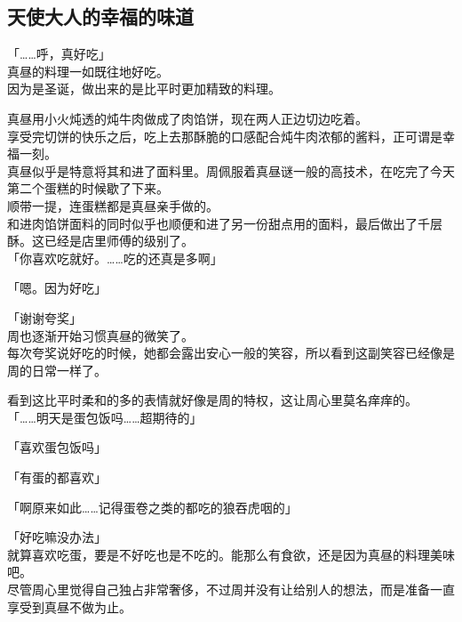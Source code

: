 \subsection{天使大人的幸福的味道}

「……呼，真好吃」\\

真昼的料理一如既往地好吃。\\

因为是圣诞，做出来的是比平时更加精致的料理。

真昼用小火炖透的炖牛肉做成了肉馅饼，现在两人正边切边吃着。\\

享受完切饼的快乐之后，吃上去那酥脆的口感配合炖牛肉浓郁的酱料，正可谓是幸福一刻。\\

真昼似乎是特意将其和进了面料里。周佩服着真昼谜一般的高技术，在吃完了今天第二个蛋糕的时候歇了下来。\\

顺带一提，连蛋糕都是真昼亲手做的。\\

和进肉馅饼面料的同时似乎也顺便和进了另一份甜点用的面料，最后做出了千层酥。这已经是店里师傅的级别了。\\

「你喜欢吃就好。……吃的还真是多啊」

「嗯。因为好吃」

「谢谢夸奖」\\

周也逐渐开始习惯真昼的微笑了。\\

每次夸奖说好吃的时候，她都会露出安心一般的笑容，所以看到这副笑容已经像是周的日常一样了。

看到这比平时柔和的多的表情就好像是周的特权，这让周心里莫名痒痒的。\\

「……明天是蛋包饭吗……超期待的」

「喜欢蛋包饭吗」

「有蛋的都喜欢」

「啊原来如此……记得蛋卷之类的都吃的狼吞虎咽的」

「好吃嘛没办法」\\

就算喜欢吃蛋，要是不好吃也是不吃的。能那么有食欲，还是因为真昼的料理美味吧。\\

尽管周心里觉得自己独占非常奢侈，不过周并没有让给别人的想法，而是准备一直享受到真昼不做为止。\\

